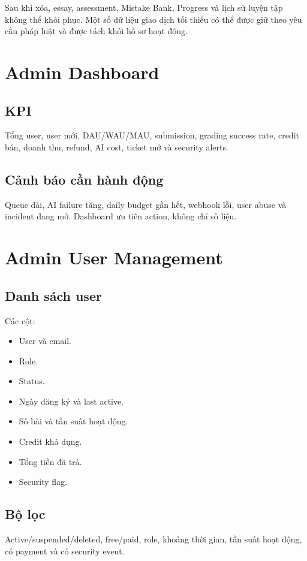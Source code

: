 \documentclass[11pt,a4paper]{article}
\begin{document}
\begin{warningbox}
Sau khi xóa, essay, assessment, Mistake Bank, Progress và lịch sử luyện tập không thể khôi phục. Một số dữ liệu giao dịch tối thiểu có thể được giữ theo yêu cầu pháp luật và được tách khỏi hồ sơ hoạt động.
\end{warningbox}

\section{Admin Dashboard}

\subsection{KPI}
Tổng user, user mới, DAU/WAU/MAU, submission, grading success rate, credit bán, doanh thu, refund, AI cost, ticket mở và security alerts.

\subsection{Cảnh báo cần hành động}
Queue dài, AI failure tăng, daily budget gần hết, webhook lỗi, user abuse và incident đang mở. Dashboard ưu tiên action, không chỉ số liệu.

\section{Admin User Management}

\subsection{Danh sách user}
Các cột:
\begin{itemize}
  \item User và email.
  \item Role.
  \item Status.
  \item Ngày đăng ký và last active.
  \item Số bài và tần suất hoạt động.
  \item Credit khả dụng.
  \item Tổng tiền đã trả.
  \item Security flag.
\end{itemize}

\subsection{Bộ lọc}
Active/suspended/deleted, free/paid, role, khoảng thời gian, tần suất hoạt động, có payment và có security event.
\end{document}
